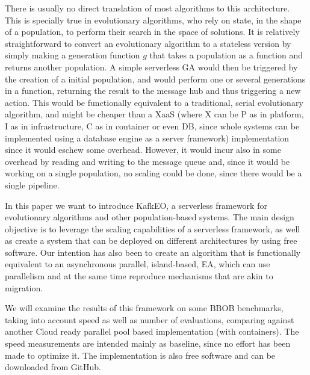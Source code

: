 \documentclass[sigconf]{acmart}
\begin{document}
There is usually no direct translation of most algorithms to this
architecture. This is specially true in evolutionary algorithms, who
rely on state, in the shape of a population, to perform their search
in the space of solutions. It is relatively straightforward to convert
an evolutionary algorithm to a stateless version by simply making a
{\sf generation} function $g$ that takes a population as a function
and returns another population. A simple serverless GA would then be
triggered by the creation of a initial population, and would perform
one or several generations in a function, returning the result to the
message hub and thus triggering a new action. This would be
functionally equivalent to a traditional, serial evolutionary
algorithm, and might be cheaper than a XaaS (where X can be P as in
platform, I as in infrastructure, C as in container or even DB, since
whole systems can be implemented using a database engine as a server framework) implementation since it
would eschew some overhead. However, it would incur also in some
overhead by reading and writing to the message queue and, since it
would be working on a single population, no scaling could be done,
since there would be a single pipeline.

In this paper we want to introduce KafkEO, a serverless framework for
evolutionary algorithms and other population-based systems. The main
design objective is to leverage the scaling capabilities of a
serverless framework, as well as create a system that can be deployed
on different architectures by using free software. Our intention has
also been to create an algorithm that is functionally equivalent to an asynchronous
parallel, island-based, EA, which can use parallelism and at the same
time reproduce mechanisms that are akin to migration.

We will examine the results of this framework on some BBOB benchmarks,
taking into account speed as well as number of evaluations, comparing
against another Cloud ready parallel pool based implementation (with
containers). The speed measurements are intended mainly as baseline,
since no effort has been made to optimize it.
The
implementation is also free software and can be downloaded from
GitHub.


\end{document}
